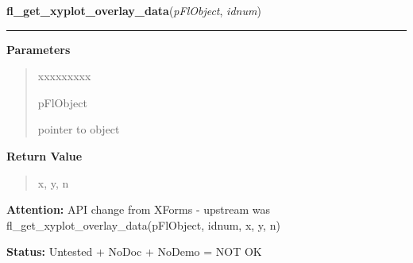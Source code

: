 \hspace{.8\funcindent}\begin{boxedminipage}{\funcwidth}

    \raggedright \textbf{fl\_get\_xyplot\_overlay\_data}(\textit{pFlObject}, \textit{idnum})

    \vspace{-1.5ex}

    \rule{\textwidth}{0.5\fboxrule}
\setlength{\parskip}{2ex}
\setlength{\parskip}{1ex}
      \textbf{Parameters}
      \vspace{-1ex}

      \begin{quote}
        \begin{Ventry}{xxxxxxxxx}

          \item[pFlObject]

          pointer to object

        \end{Ventry}

      \end{quote}

      \textbf{Return Value}
    \vspace{-1ex}

      \begin{quote}
      x, y, n

      \end{quote}

\textbf{Attention:} API change from XForms - upstream was 
fl\_get\_xyplot\_overlay\_data(pFlObject, idnum, x, y, n)



\textbf{Status:} Untested + NoDoc + NoDemo = NOT OK



    \end{boxedminipage}

    \label{xformslib:flxyplot:fl_set_xyplot_overlay_type}

    \vspace{0.5ex}

